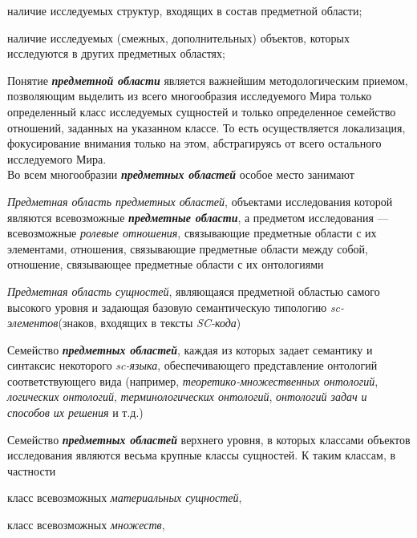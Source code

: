 \begin{SCn}
\begin{scnsubstruct}
\begin{scnsubstruct}
{\begin{scnitemize}
                    \item наличие исследуемых структур, входящих в состав предметной области;
                    \item наличие исследуемых (смежных, дополнительных) объектов, которых исследуются в других предметных областях;
                \end{scnitemize}
                Понятие \textbf{\textit{предметной области}} является важнейшим методологическим приемом, позволяющим выделить из всего многообразия исследуемого Мира только определенный класс исследуемых сущностей и только определенное семейство отношений, заданных на указанном классе. То есть осуществляется локализация, фокусирование внимания только на этом, абстрагируясь от всего остального исследуемого Мира.\\
                Во всем многообразии \textbf{\textit{предметных областей}} особое место занимают
                \begin{scnitemize}
                    \item \textit{Предметная область предметных областей}, объектами исследования которой являются всевозможные \textbf{\textit{предметные области}}, а предметом исследования --- всевозможные \textit{ролевые отношения}, связывающие предметные области с их элементами, отношения, связывающие предметные области между собой, отношение, связывающее предметные области с их онтологиями
                    \item \textit{Предметная область сущностей}, являющаяся предметной областью самого высокого уровня и задающая базовую семантическую типологию \textit{sc-элементов}(знаков, входящих в тексты \textit{SC-кода})
                    \item Семейство \textbf{\textit{предметных областей}}, каждая из которых задает семантику и синтаксис некоторого \textit{sc-языка}, обеспечивающего представление онтологий соответствующего вида (например, \textit{теоретико-множественных онтологий}, \textit{логических онтологий}, \textit{терминологических онтологий}, \textit{онтологий задач и способов их решения} и т.д.)
                    \item Семейство \textbf{\textit{предметных областей}} верхнего уровня, в которых классами объектов исследования являются весьма крупные классы сущностей. К таким классам, в частности
                    \begin{scnitemizeii}
                        \item класс всевозможных \textit{материальных сущностей},
                        \item класс всевозможных \textit{множеств},

\end{scnitemizeii}
\end{scnitemize}}
\end{scnsubstruct}
\end{scnsubstruct}
\end{SCn}
